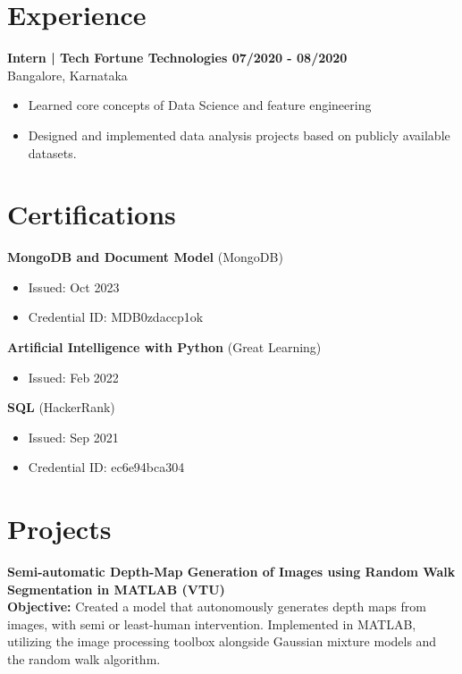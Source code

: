 \documentclass[a4paper,10pt]{article}
\begin{document}
\section*{Experience}
    \textbf{Intern | Tech Fortune Technologies \hfill 07/2020 - 08/2020}\\
    Bangalore, Karnataka
    \begin{itemize}
        \item Learned core concepts of Data Science and feature engineering
        \item Designed and implemented data analysis projects based on publicly available datasets.
    \end{itemize}

\section*{Certifications}
    
    \textbf{MongoDB and Document Model} (MongoDB)
    \begin{itemize}
        \item Issued: Oct 2023
        \item Credential ID: MDB0zdaccp1ok
    \end{itemize}
    
    \textbf{Artificial Intelligence with Python} (Great Learning)
    \begin{itemize}
        \item Issued: Feb 2022
    \end{itemize}
    
    \textbf{SQL} (HackerRank)
    \begin{itemize}
        \item Issued: Sep 2021
        \item Credential ID: ec6e94bca304
    \end{itemize}
    
\section*{Projects}
    \textbf{Semi-automatic Depth-Map Generation of Images using Random Walk Segmentation in MATLAB (VTU)}\\
    \textbf{Objective:} Created a model that autonomously generates depth maps from images, with semi or least-human intervention. Implemented in MATLAB, utilizing the image processing toolbox alongside Gaussian mixture models and the random walk algorithm. 
    
\end{document}
